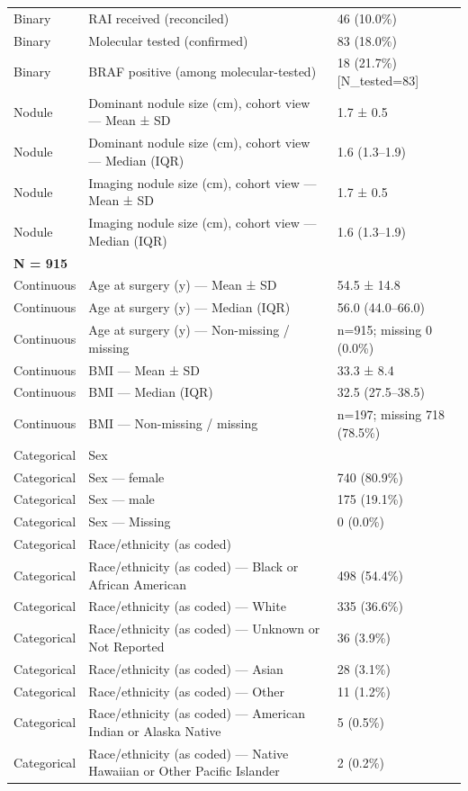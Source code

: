\begin{table}[htbp]
\begin{tabular}{lll}
Binary & RAI received (reconciled) & 46 (10.0\%) \\
Binary & Molecular tested (confirmed) & 83 (18.0\%) \\
Binary & BRAF positive (among molecular-tested) & 18 (21.7\%) [N\_tested=83] \\
Nodule & Dominant nodule size (cm), cohort view — Mean ± SD & 1.7 ± 0.5 \\
Nodule & Dominant nodule size (cm), cohort view — Median (IQR) & 1.6 (1.3–1.9) \\
Nodule & Imaging nodule size (cm), cohort view — Mean ± SD & 1.7 ± 0.5 \\
Nodule & Imaging nodule size (cm), cohort view — Median (IQR) & 1.6 (1.3–1.9) \\
\multicolumn{3}{l}{\textbf{N = 915}} \\
Continuous & Age at surgery (y) — Mean ± SD & 54.5 ± 14.8 \\
Continuous & Age at surgery (y) — Median (IQR) & 56.0 (44.0–66.0) \\
Continuous & Age at surgery (y) — Non-missing / missing & n=915; missing 0 (0.0\%) \\
Continuous & BMI — Mean ± SD & 33.3 ± 8.4 \\
Continuous & BMI — Median (IQR) & 32.5 (27.5–38.5) \\
Continuous & BMI — Non-missing / missing & n=197; missing 718 (78.5\%) \\
Categorical & Sex &  \\
Categorical & Sex — female & 740 (80.9\%) \\
Categorical & Sex — male & 175 (19.1\%) \\
Categorical & Sex — Missing & 0 (0.0\%) \\
Categorical & Race/ethnicity (as coded) &  \\
Categorical & Race/ethnicity (as coded) — Black or African American & 498 (54.4\%) \\
Categorical & Race/ethnicity (as coded) — White & 335 (36.6\%) \\
Categorical & Race/ethnicity (as coded) — Unknown or Not Reported & 36 (3.9\%) \\
Categorical & Race/ethnicity (as coded) — Asian & 28 (3.1\%) \\
Categorical & Race/ethnicity (as coded) — Other & 11 (1.2\%) \\
Categorical & Race/ethnicity (as coded) — American Indian or Alaska Native & 5 (0.5\%) \\
Categorical & Race/ethnicity (as coded) — Native Hawaiian or Other Pacific Islander & 2 (0.2\%) \\

\end{tabular}
\end{table}
